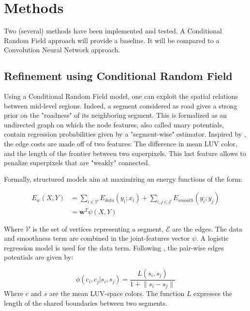 \documentclass[10pt,conference,compsocconf]{IEEEtran}
\begin{document}
\section{Methods}
\label{sec:orgheadline11}
Two (several) methods have been implemented and tested. A Conditional Random Field approach will provide a baseline. It will be compared to a Convolution Neural Network approach.
\subsection{Refinement using Conditional Random Field}
\label{sec:orgheadline10}
   Using a Conditional Random Field model, one can exploit the spatial relations between mid-level regions. Indeed, a segment considered as road gives a strong prior on the "roadness" of its neighboring segment. This is formalized as an undirected graph on which the node features, also called unary potentials, contain regression probabilities given by a "segment-wise" estimator. 
Inspired by \cite{fulkerson09}, the edge costs are made off of two features: The difference in mean LUV color, and the length of the frontier between two superpixels. This last feature allows to penalize superpixels that are "weakly" connected.

Formally, structured models aim at maximizing an energy functions of the form:

 \begin{equation}
 \begin{split}
E_w(X,Y) &= \sum_{i \in \mathcal{V}} E_{data}(y_i;x_i) + \sum_{i,j \in \mathcal{E}} E_{smooth}(y_i;y_j) \\
 &= \mathbf{w}^T \psi(X,Y)
 \end{split}
 \end{equation}

Where \(\mathcal{V}\) is the set of vertices representing a segment, \(\mathcal{E}\) are the edges. The data and smoothness term are combined in the joint-features vector \(\psi\). A logistic regression model is used for the data term. Following \cite{fulkerson09}, the pair-wise edges potentials are given by:

 \begin{equation}
\phi(c_i,c_j|s_i,s_j) = \frac{L(s_i,s_j)}{1+\lVert s_i - s_j \rVert}
 \end{equation}
Where \(c\) and \(s\) are the mean LUV-space colors. The function \(L\) expresses the length of the shared boundaries between two segments.
\end{document}
